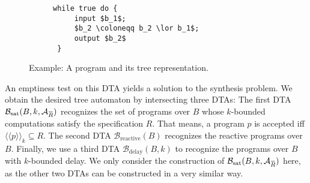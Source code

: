 \documentclass[submission,copyright,creativecommons]{eptcs}
\newcommand{\overbar}[1]{\mkern 1.5mu\overline{\mkern-1.5mu#1\mkern-1.5mu}\mkern 1.5mu}\newcommand{\nothing}{$\,$}
\newcommand{\ignore}[1]{}
\newcommand{\z}[1]{\text{#1}}
\newcommand{\aut}[1]{\mathcal{#1}}
\newcommand{\specaut}{\aut{A}_{\overbar{R}}}
\newcommand{\sembrackk}[1]{\langle\langle #1 \rangle\rangle}\newcommand{\lbar}[1]{\overline{#1}}
\begin{document}
\begin{figure}[h!]
\centering

\setlength{\FrameSep}{\fboxsep-0.5mm}\begin{subfigure}[h]{0.3\linewidth}\ignore{TODO: Better example?}
\begin{framed}
\begin{minipage}[c][3.8cm][c]{\linewidth}\begin{lstlisting}[linewidth=\dimexpr\linewidth-8mm\relax,xleftmargin=2mm]
 while true do {
     input $b_1$;
     $b_2 \coloneqq b_2 \lor b_1$;
     output $b_2$
 }
\end{lstlisting}
\end{minipage}
\end{framed}
\end{subfigure}
\begin{subfigure}[h]{0.6\linewidth}
\begin{framed}
\begin{minipage}[c][3.8cm]{\linewidth}
\centering
\vspace{2mm}
\vspace{2mm}
\end{minipage}
\end{framed}
\end{subfigure}

\caption{Example: A program and its tree representation.}
\label{progtreeex}
\end{figure}

An emptiness test on this DTA yields a solution to the synthesis problem.
We obtain the desired tree automaton by intersecting three DTAs:
The first DTA $\aut{B}_\z{sat}(B,k,\specaut)$ recognizes
the set of programs over $B$ whose $k$-bounded computations satisfy the
specification $R$. That means, a program $p$ is accepted iff
$\sembrackk{p}_k \subseteq R$.
The second DTA $\aut{B}_\z{reactive}(B)$ recognizes the reactive
programs over $B$.
Finally, we use a third DTA $\aut{B}_\z{delay}(B,k)$ to recognize the programs
over $B$ with $k$-bounded delay.
We only consider the construction of $\aut{B}_\z{sat}(B,k,\specaut)$ here,
as the other two DTAs can be constructed in a very similar way.
\end{document}
